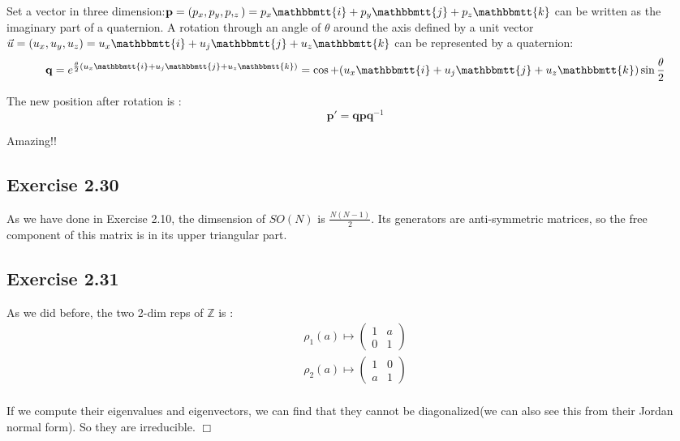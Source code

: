\documentclass[]{ctexart}
\newcommand{\mi}{\mathbbmtt{i}}
\newcommand{\mj}{\mathbbmtt{j}}
\newcommand{\mk}{\mathbbmtt{k}}
\begin{document}
			Set a vector in three dimension:$\mathbf{p}=(p_x,p_y,p,_z)=p_x\mi +p_y\mj +p_z\mk$ can be written as the imaginary part of a quaternion. A rotation through an angle of $\theta$ around the axis defined by a unit vector $\vec{u}=(u_x,u_y,u_z)=u_x\mi+u_j\mj+u_z\mk$ can be represented by a quaternion:
				\begin{equation*}
					\mathbf{q}=e^{\frac{\theta}{2}(u_x\mi+u_j\mj+u_z\mk)}=\cos +(u_x\mi+u_j\mj+u_z\mk)\sin\frac{\theta}{2}
				\end{equation*}
			
			The new position after rotation is :
				\begin{equation*}
					\mathbf{p}'=\mathbf{qpq}^{-1}
				\end{equation*}
				
			Amazing!!
		
	\subsection{Exercise 2.30}
		As we have done in Exercise 2.10, the dimsension of $SO(N)$ is $\frac{N(N-1)}{2}$. Its generators are anti-symmetric matrices, so the free component of this matrix is in its upper triangular part. 
		
	\subsection{Exercise 2.31}
		As we did before, the two 2-dim reps of $\mathbb{Z}$ is :
			\begin{equation*}
			\begin{aligned}
				\rho_1(a) \mapsto
				\begin{pmatrix}
				1 & a\\
				0 & 1
				\end{pmatrix}\\
				\rho_2(a) \mapsto
				\begin{pmatrix}
				1 & 0\\
				a & 1
				\end{pmatrix}\\
			\end{aligned}
			\end{equation*}
		
		If we compute their eigenvalues and eigenvectors, we can find that they cannot be diagonalized(we can also see this from their Jordan normal form). So they are irreducible. \qquad $\Box$
		
\end{document}
